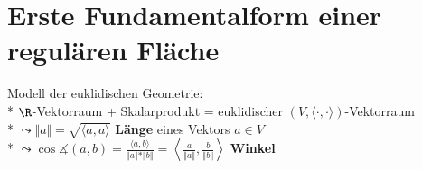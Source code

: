 \section{Erste Fundamentalform einer regulären Fläche}

\begin{remark}[Erinnerung an LA]
  Modell der euklidischen Geometrie: \\*
  $ \R $-Vektorraum + Skalarprodukt = euklidischer $ (V, \langle \cdot, \cdot \rangle) $-Vektorraum \\*
  $ \leadsto \Vert a \Vert = \sqrt{\langle a, a \rangle} $ \textbf{Länge} eines Vektors $ a \in V $ \\*
  $ \leadsto \cos \measuredangle(a,b) = \frac{\langle a, b \rangle}{\Vert a \Vert*\Vert b \Vert} = \left\langle \frac{a}{\Vert a \Vert}, \frac{b}{\Vert b \Vert} \right\rangle $ \textbf{Winkel} \\
\end{remark}

